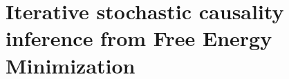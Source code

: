 \documentclass[prx,twocolumn,twoside,showpacs,superscriptaddress]{revtex4-1}
\begin{document}
\section{Iterative stochastic causality inference from Free Energy Minimization}
%
\end{document}
